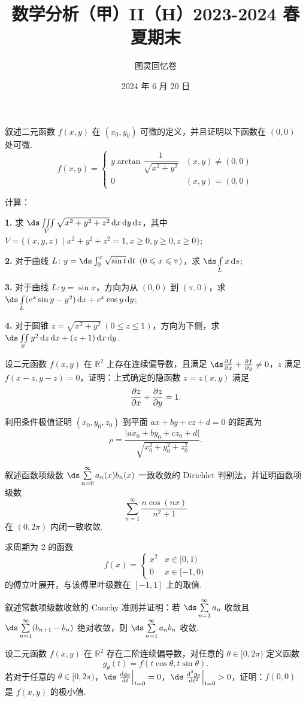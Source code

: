 \documentclass[UTF8,14pt,normal]{ctexart}
\title{\vspace{-4em}\textbf{数学分析（甲）II（H）2023-2024 春夏期末}}
\author{图灵回忆卷}
\date{2024 年 6 月 20 日}
\begin{document}
\maketitle

 叙述二元函数 $f(x, y)$ 在 $(x_0, y_0)$ 可微的定义，并且证明以下函数在 $(0, 0)$ 处可微. \[f(x, y) = \begin{cases}
    y\arctan\dfrac{1}{\sqrt{x^2 + y^2}}  & (x, y) \neq (0, 0)\\
    0                                    & (x, y) = (0, 0)
\end{cases}\]

 计算：

\textbf{1.} 求 $\ds\iiint\limits_{V}\sqrt{x^2 + y^2 + z^2}\dd{x}\dd{y}\dd{z}$，其中 $V = \{(x, y, z) \mid x^2 + y^2 + z^2 = 1, x\geqslant 0, y\geqslant 0, z\geqslant 0\}$;

\textbf{2.} 对于曲线 $L \colon y = \ds\int_0^x\sqrt{\sin t}\dd{t}\ (0\leqslant x\leqslant \pi)$，求 $\ds\int\limits_Lx\dd{s}$;

\textbf{3.} 对于曲线 $L \colon y = \sin x$，方向为从 $(0, 0)$ 到 $(\pi, 0)$，求 $\ds\int\limits_L(e^x\sin y-y^2)\dd{x} + e^x\cos{y} \dd{y}$;

\textbf{4.} 对于圆锥 $z = \sqrt{x^2 + y^2}\ (0\leqslant z\leqslant 1)$，方向为下侧，求 $\ds\iint\limits_{S}y^2\dd{z}\dd{x} + (z + 1)\dd{x}\dd{y}$.

 设二元函数 $f(x, y)$ 在 $\mathbb{R}^2$ 上存在连续偏导数，且满足 $\ds\pdv{f}{x} + \pdv{f}{y} \neq 0$，$z$ 满足 $f(x - z, y - z) = 0$，证明：上式确定的隐函数 $z = z(x, y)$ 满足 \[\pdv{z}{x} + \pdv{z}{y} = 1.\]

 利用条件极值证明 $(x_0, y_0, z_0)$ 到平面 $ax + by + cz + d = 0$ 的距离为 \[\rho = \dfrac{\lvert ax_0 + by_0 + cz_0 + d\rvert}{\sqrt{x_0^2 + y_0^2 + z_0^2}}.\]

 叙述函数项级数 $\ds\sum\limits_{n=0}^{\infty} a_n(x)b_n(x)$ 一致收敛的 Dirichlet 判别法，并证明函数项级数 \[\sum_{n=1}^{\infty} \dfrac{n\cos(nx)}{n^2+1}\] 在 $(0, 2\pi)$ 内闭一致收敛.

 求周期为 $2$ 的函数 \[f(x) = \begin{cases}
    x^2   & x\in [0 , 1) \\
    0     & x\in [-1, 0)
\end{cases}\] 的傅立叶展开，与该傅里叶级数在 $[-1, 1]$ 上的取值.

 叙述常数项级数收敛的 Cauchy 准则并证明：若 $\ds\sum\limits_{n=1}^{\infty} a_n$ 收敛且 $\ds\sum\limits_{n=1}^{\infty}(b_{n+1} - b_n)$ 绝对收敛，则 $\ds\sum\limits_{n=1}^{\infty} a_nb_n$ 收敛.

 设二元函数 $f(x, y)$ 在 $\mathbb{R}^2$ 存在二阶连续偏导数，对任意的 $\theta\in [0, 2\pi)$ 定义函数 \[g_\theta(t) = f(t\cos\theta, t\sin\theta).\]
若对于任意的 $\theta\in [0, 2\pi)$，$\ds\left.\dv{g_\theta}{t}\right\vert_{t=0} = 0$，$\ds\left.\dv[2]{g_\theta}{t}\right\vert_{t=0} > 0$，证明：$f(0, 0)$ 是 $f(x, y)$ 的极小值.
\end{document}
